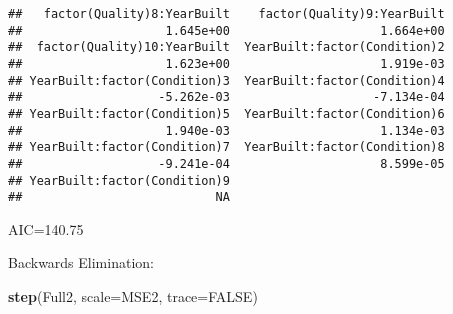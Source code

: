 \documentclass[
]{article}
\newenvironment{Shaded}{\begin{snugshade}}{\end{snugshade}}
\newcommand{\DataTypeTok}[1]{\textcolor[rgb]{0.13,0.29,0.53}{#1}}
\newcommand{\KeywordTok}[1]{\textcolor[rgb]{0.13,0.29,0.53}{\textbf{#1}}}
\newcommand{\NormalTok}[1]{#1}
\newcommand{\OtherTok}[1]{\textcolor[rgb]{0.56,0.35,0.01}{#1}}
\begin{document}
\begin{verbatim}
##   factor(Quality)8:YearBuilt    factor(Quality)9:YearBuilt  
##                    1.645e+00                     1.664e+00  
##  factor(Quality)10:YearBuilt  YearBuilt:factor(Condition)2  
##                    1.623e+00                     1.919e-03  
## YearBuilt:factor(Condition)3  YearBuilt:factor(Condition)4  
##                   -5.262e-03                    -7.134e-04  
## YearBuilt:factor(Condition)5  YearBuilt:factor(Condition)6  
##                    1.940e-03                     1.134e-03  
## YearBuilt:factor(Condition)7  YearBuilt:factor(Condition)8  
##                   -9.241e-04                     8.599e-05  
## YearBuilt:factor(Condition)9  
##                           NA
\end{verbatim}

AIC=140.75

Backwards Elimination:

\begin{Shaded}
\begin{Highlighting}[]
\KeywordTok{step}\NormalTok{(Full2, }\DataTypeTok{scale=}\NormalTok{MSE2, }\DataTypeTok{trace=}\OtherTok{FALSE}\NormalTok{)}
\end{Highlighting}
\end{Shaded}
\end{document}
